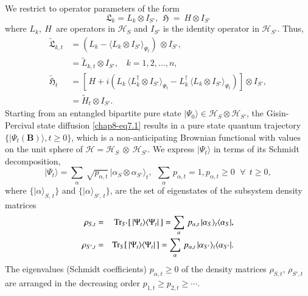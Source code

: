  We restrict to operator parameters of the form 
 \begin{equation}
 \mathfrak{L}_{k}=L_k\otimes I_{S'},\  \ \mathfrak{H}~=~H\otimes I_{S'} \label{chap8-eq7.3}
 \end{equation}
  where $L_k,\ H\,$ are operators  in $\mathcal{H}_{S}$ and $I_{S'}$ is the identity operator in $\mathcal{H}_{S'}$. Thus,     
\begin{align} 
\widetilde{\mathfrak{L}}_{k,t}&= \left( L_k -\langle L_k \otimes I_{S'} \rangle_{\Psi_t}\right)\, \otimes I_{S'},   \nonumber \\
&= \widetilde{L}_{k,t}\otimes I_{S'},\ \ \ \ k=1,2,\ldots, n, \nonumber \\     
\widetilde{\mathfrak{H}}_t &= \left[\, H  +i\left(L_k\, \langle L^\dag_k\otimes I_{S'}\rangle_{\Psi_t}-
L^\dag_k\, \langle L_k\otimes I_{S'}\rangle_{\Psi_t} \right)\right]\otimes I_{S'}, \nonumber \\ 
&= \widetilde{H}_t \otimes I_{S'}.    \label{chap8-eq7.4}
\end{align}
Starting from an entangled bipartite pure state $\vert\Psi_0\rangle\in \mathcal{H}_{S}\otimes\mathcal{H}_{S'}$, the Gisin-Percival state diffusion \eqref{chap8-eq7.1} results in a pure state quantum trajectory $\{\vert\Psi_t(\mathbf{B})\rangle, t\geq 0\}$, which is a non-anticipating Brownian functional with values on the unit sphere of $\mathcal{H}=\mathcal{H}_{S}~\otimes~\mathcal{H}_{S'}$. We express  $\vert\Psi_t\rangle$  in terms of its Schmidt decomposition,     
\begin{equation} 
\vert\Psi_t\rangle=\sum_{\alpha}\, \sqrt{p_{\alpha,t}}\, \vert \alpha_{S}\otimes \alpha_{S'}\rangle_t, \ \  \sum_{\alpha}\, p_{\alpha,t}= 1, p_{\alpha, t}\geq 0 \,\ \  \forall\ \  t\geq 0,\label{chap8-eq7.5}
\end{equation}
where $\{\vert \alpha\rangle_{S,\,t}\}$ and  $\{\vert \alpha\rangle_{S',\, t}\}$, are the set of eigenstates of the subsystem density matrices 
\begin{eqnarray*}
	\rho_{S,t}&=&{\rm Tr}_{S'}[\,\vert\Psi_t\rangle\langle \Psi_t\vert\,]=\sum_\alpha\, p_{\alpha, t}\, \vert\alpha_S\rangle_t\langle\alpha_S\vert, \nonumber \\ 
	\rho_{S',t}&=&{\rm Tr}_{S}[\,\vert\Psi_t\rangle\langle \Psi_t\vert\,]=\sum_\alpha\, p_{\alpha, t}\, \vert\alpha_{S'}\rangle_t\langle\alpha_{S'}\vert.
\end{eqnarray*} 
The eigenvalues (Schmidt coefficients) $p_{\alpha, t}\geq 0$ of the density matrices $\rho_{S,t}$, $\rho_{S',t}$ are arranged in the decreasing order $p_{1,t}\geq p_{2,t}\geq \cdots$. 

